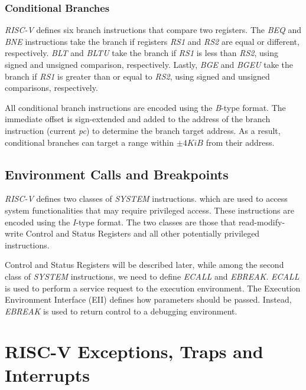 \subsubsection{Conditional Branches}
\label{subsubsec:riscv_conditionalb}

\textit{RISC-V} defines six branch instructions that compare two registers. The \textit{BEQ}
and \textit{BNE} instructions take the branch if registers \textit{RS1} and
\textit{RS2} are equal or different, respectively. \textit{BLT} and \textit{BLTU}
take the branch if \textit{RS1} is less than \textit{RS2}, using signed and
unsigned comparison, respectively. Lastly, \textit{BGE} and \textit{BGEU} take the
branch if \textit{RS1} is greater than or equal to \textit{RS2}, using signed
and unsigned comparisons, respectively.

All conditional branch instructions are encoded using the \textit{B}-type format.
The immediate offset is sign-extended and added to the address of the branch instruction
(current \textit{pc}) to determine the branch target address. As a result,
conditional branches can target a range within $\pm 4 \textit{KiB}$ from their
address.

\subsection{Environment Calls and Breakpoints}
\label{subsec:riscv_ecalls}

\textit{RISC-V} defines two classes of \textit{SYSTEM} instructions. which are
used to access system functionalities that may require privileged access. These instructions
are encoded using the \textit{I}-type format. The two classes are those that read-modify-write
Control and Status Registers and all other potentially privileged instructions.

Control and Status Registers will be described later, while among the second
class of \textit{SYSTEM} instructions, we need to define \textit{ECALL} and \textit{EBREAK}.
\textit{ECALL} is used to perform a service request to the execution environment.
The Execution Environment Interface (EII) defines how parameters should be passed.
Instead, \textit{EBREAK} is used to return control to a debugging environment.

\section{RISC-V Exceptions, Traps and Interrupts}
\label{sec:riscv_eti}

